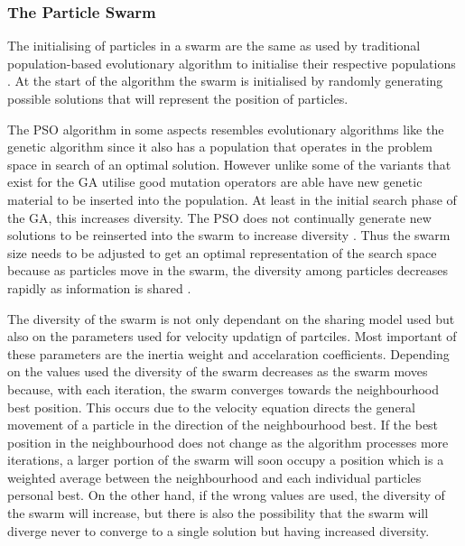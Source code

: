 \subsubsection{The Particle Swarm}
The initialising of particles in a swarm are the same as used by traditional population-based evolutionary algorithm to initialise their respective populations \cite{FixedFAPPSO}.  At the start of the algorithm the swarm is initialised by randomly generating possible solutions that will represent the position of particles\cite{CompuIntelligenceIntro}. 

The \gls{PSO} algorithm in some aspects resembles evolutionary algorithms like the genetic algorithm since it also has a population that operates in the problem space in search of an optimal solution. However unlike some of the variants that exist for the \gls{GA} utilise good mutation operators are able have new genetic material to be inserted into the population. At least in the initial search phase of the GA, this increases diversity\cite{CompuIntelligenceIntro}. The \gls{PSO} does not continually generate new solutions to be reinserted into the swarm to increase diversity \cite{PSOHybridUnitCommit}. Thus the swarm size needs to be adjusted to get an optimal representation of the search space because as particles move in the swarm, the diversity among particles decreases rapidly as information is shared \cite{FundamentalSwarm,CompuIntelligenceIntro}. 

The diversity of the swarm is not only dependant on the sharing model used but also on the parameters used for velocity updatign of partciles. Most important of these parameters are the inertia weight and accelaration coefficients. Depending on the values used the diversity of the swarm decreases as the swarm moves because, with each iteration, the swarm converges towards the neighbourhood best position\cite{PSOHybridJobShop,CompuIntelligenceIntro,FundamentalSwarm}. This occurs due to the velocity equation directs the general movement of a particle in the direction of the neighbourhood best\cite{PSOHybridJobShop,CompuIntelligenceIntro,FundamentalSwarm}. If the best position in the neighbourhood does not change as the algorithm processes more iterations, a larger portion of the swarm will soon occupy a position which is a weighted average between the neighbourhood and each individual particles personal best\cite{PSOHybridJobShop,CompuIntelligenceIntro,FundamentalSwarm}. On the other hand, if the wrong values are used, the diversity of the swarm will increase, but there is also the possibility that the swarm will diverge never to converge to a single solution but having increased diversity\cite{FundamentalSwarm}.

